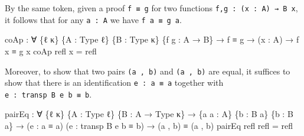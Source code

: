 \documentclass[
  11pt,
  oneside,
  article]{memoir}
\newenvironment{Shaded}{}{}
\newcommand{\NormalTok}[1]{#1}
\newcommand{\OtherTok}[1]{\textcolor[rgb]{0.00,0.44,0.13}{#1}}
\theoremstyle{definition}
\theoremstyle{plain}
\newcommand{\0}{\textsf{0}}
\newcommand{\1}{\tn{\textsf{1}}}
\begin{document}
By the same token, given a proof \texttt{f\ ≡\ g} for two functions
\texttt{f,g\ :\ (x\ :\ A)\ →\ B\ x}, it follows that for any
\texttt{a\ :\ A} we have \texttt{f\ a\ ≡\ g\ a}.

\begin{Shaded}
\begin{Highlighting}[]
\NormalTok{coAp }\OtherTok{:} \OtherTok{∀} \OtherTok{\{}\NormalTok{ℓ κ}\OtherTok{\}} \OtherTok{\{}\NormalTok{A }\OtherTok{:}\NormalTok{ Type ℓ}\OtherTok{\}} \OtherTok{\{}\NormalTok{B }\OtherTok{:}\NormalTok{ Type κ}\OtherTok{\}} \OtherTok{\{}\NormalTok{f g }\OtherTok{:}\NormalTok{ A }\OtherTok{→}\NormalTok{ B}\OtherTok{\}}
       \OtherTok{→}\NormalTok{ f ≡ g }\OtherTok{→} \OtherTok{(}\NormalTok{x }\OtherTok{:}\NormalTok{ A}\OtherTok{)} \OtherTok{→}\NormalTok{ f x ≡ g x}
\NormalTok{coAp refl x }\OtherTok{=}\NormalTok{ refl}
\end{Highlighting}
\end{Shaded}

Moreover, to show that two pairs \texttt{(a\ ,\ b)} and
\texttt{(a\textquotesingle{}\ ,\ b\textquotesingle{})} are equal, it
suffices to show that there is an identification
\texttt{e\ :\ a\ ≡\ a\textquotesingle{}} together with
\texttt{e\textquotesingle{}\ :\ transp\ B\ e\ b\ ≡\ b\textquotesingle{}}.

\begin{Shaded}
\begin{Highlighting}[]
\NormalTok{pairEq }\OtherTok{:} \OtherTok{∀} \OtherTok{\{}\NormalTok{ℓ κ}\OtherTok{\}} \OtherTok{\{}\NormalTok{A }\OtherTok{:}\NormalTok{ Type ℓ}\OtherTok{\}} \OtherTok{\{}\NormalTok{B }\OtherTok{:}\NormalTok{ A }\OtherTok{→}\NormalTok{ Type κ}\OtherTok{\}} 
         \OtherTok{→} \OtherTok{\{}\NormalTok{a a\textquotesingle{} }\OtherTok{:}\NormalTok{ A}\OtherTok{\}} \OtherTok{\{}\NormalTok{b }\OtherTok{:}\NormalTok{ B a}\OtherTok{\}} \OtherTok{\{}\NormalTok{b\textquotesingle{} }\OtherTok{:}\NormalTok{ B a\textquotesingle{}}\OtherTok{\}}
         \OtherTok{→} \OtherTok{(}\NormalTok{e }\OtherTok{:}\NormalTok{ a ≡ a\textquotesingle{}}\OtherTok{)} \OtherTok{(}\NormalTok{e\textquotesingle{} }\OtherTok{:}\NormalTok{ transp B e b ≡ b\textquotesingle{}}\OtherTok{)} 
         \OtherTok{→} \OtherTok{(}\NormalTok{a , b}\OtherTok{)}\NormalTok{ ≡ }\OtherTok{(}\NormalTok{a\textquotesingle{} , b\textquotesingle{}}\OtherTok{)}
\NormalTok{pairEq refl refl }\OtherTok{=}\NormalTok{ refl}
\end{Highlighting}
\end{Shaded}
\end{document}
